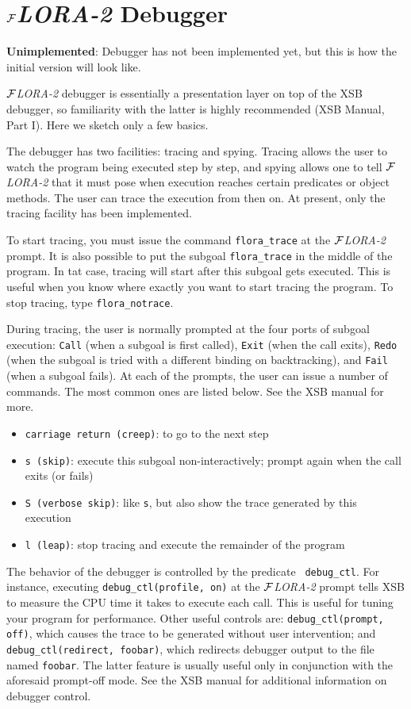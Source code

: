\documentclass[11pt]{article}
\newcommand{\FLORA}{{\mbox{${\cal F}${\small\it LORA}\rm\emph{-2}}}\xspace}
\begin{document}
\section{\FLORA Debugger}


{\bf Unimplemented}: Debugger has not been implemented yet, but this is how
the initial version will look like.


\FLORA debugger is essentially a presentation layer on top of the XSB
debugger, so familiarity with the latter is highly recommended (XSB Manual,
Part I). Here we sketch only a few basics.

The debugger has two facilities: tracing and spying. Tracing allows the
user to watch the program being executed step by step, and spying allows
one to tell \FLORA that it must pose when execution reaches certain 
predicates or object methods. The user can trace the execution from then
on. At present, only the tracing facility has been implemented.

To start tracing, you must issue the command {\tt flora\_trace} at the
\FLORA prompt. It is also possible to put the subgoal {\tt flora\_trace} in
the middle of the program. In tat case, tracing will start after this
subgoal gets executed. This is useful when you know where exactly you want
to start tracing the program. To stop tracing, type {\tt flora\_notrace}.

During tracing, the user is normally prompted at the four ports of subgoal
execution: {\tt Call} (when a subgoal is first called), {\tt Exit} (when
the call exits), {\tt Redo} (when the subgoal is tried with a different
binding on backtracking), and {\tt Fail} (when a subgoal fails).
At each of the prompts, the user can issue a number of commands. The most
common ones are listed below. See the XSB manual for more.
\begin{itemize}
  \item {\tt carriage return (creep)}:  to go to the next step  
  \item {\tt s (skip)}: execute this subgoal non-interactively; prompt
    again when the call exits (or fails)
  \item {\tt S (verbose skip)}: like {\tt s}, but also show the trace
    generated by this execution
  \item {\tt l (leap)}: stop tracing and execute the remainder of the
    program
\end{itemize}
The behavior of the debugger is controlled by the predicate {\tt
  debug\_ctl}. For instance, executing {\tt debug\_ctl(profile, on)} at the
\FLORA prompt tells XSB to measure the CPU time it takes to execute each
call. This is useful for tuning your program for performance. Other useful
controls are: {\tt debug\_ctl(prompt, off)}, which causes the trace to be
generated without user intervention; and {\tt debug\_ctl(redirect,
  foobar)}, which redirects debugger output to the file named {\tt foobar}.
The latter feature is usually useful only in conjunction with the
  aforesaid prompt-off mode. See the XSB manual for additional information
  on debugger control.
\end{document}
